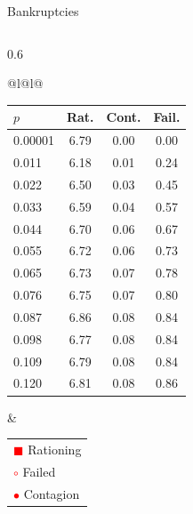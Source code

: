 \documentclass[aspectratio=169,10pt]{beamer}
\begin{document}
\begin{frame}{Bankruptcies}
\begin{columns}[T]
\begin{column}{0.6\textwidth}
\begin{tabular}{@{}l@{\hspace{0.3cm}}l@{}}
        \begin{tabular}{lccc}
          \toprule
          $p$ & Rat. & Cont. & Fail. \\
          \midrule
          0.00001 & 6.79 & 0.00 & 0.00 \\
          0.011 & 6.18 & 0.01 & 0.24 \\
          0.022 & 6.50 & 0.03 & 0.45 \\
          0.033 & 6.59 & 0.04 & 0.57 \\
          0.044 & 6.70 & 0.06 & 0.67 \\
          0.055 & 6.72 & 0.06 & 0.73 \\
          0.065 & 6.73 & 0.07 & 0.78 \\
          0.076 & 6.75 & 0.07 & 0.80 \\
          0.087 & 6.86 & 0.08 & 0.84 \\
          0.098 & 6.77 & 0.08 & 0.84 \\
          0.109 & 6.79 & 0.08 & 0.84 \\
          0.120 & 6.81 & 0.08 & 0.86 \\
          \bottomrule
        \end{tabular}
        &
        \begin{tabular}{l}
          \textcolor{red}{$\blacksquare$} Rationing \\
          \textcolor{red}{$\circ$} Failed \\
          \textcolor{red}{$\bullet$} Contagion
        \end{tabular}
      \end{tabular}
    \end{column}
  \end{columns}
\end{frame}
\end{document}
